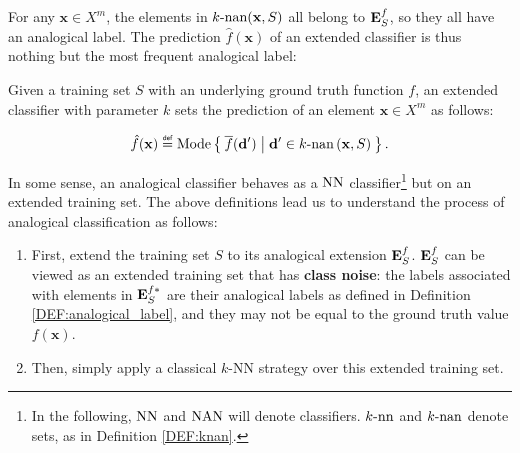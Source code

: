 For any $\mathbf{x} \in X^m$, the elements in $k\text{-nan}(\mathbf{x}, S)$ all belong
to $\mathbf{E}_{S}^{f}$, so they all have an analogical label. The prediction
$\hat{f}(\mathbf{x})$ of an extended classifier is thus nothing but the most
frequent analogical label:

\begin{definition}
  \label{DEF:extended_classifier}
  Given a training set $S$ with an underlying ground truth function $f$,
  an extended classifier with parameter $k$ sets the prediction of an element
  $\mathbf{x} \in X^m$ as follows:

  $$\hat{f}(\mathbf{x}) \eqdef \text{Mode}\Set{\albl{\mathbf{d}'} | \mathbf{d}'
  \in k\text{-nan}\left(\mathbf{x}, S\right)}.
  $$
\end{definition}

In some sense, an analogical classifier behaves as a $\text{NN}$
classifier\footnote{In the following, $\text{NN}$ and $\mbox{NAN}$ will denote classifiers.
$k\text{-nn}$ and $k\text{-nan}$ denote sets, as in Definition \ref{DEF:knan}.} but
on an extended training set. The above definitions lead us to understand the
process of analogical classification as follows:
\begin{enumerate}
  \item First, extend the training set $S$ to its analogical extension
    $\mathbf{E}_{S}^{f}$. $\mathbf{E}_{S}^{f}$ can be viewed as an extended training set that has
    \textbf{class noise}: the labels associated with elements in $\mathbf{E}_{S}^{f*}$ are
    their analogical labels as defined in Definition
    \ref{DEF:analogical_label}, and they may not be equal to the ground truth
    value $f(\mathbf{x})$.
  \item Then, simply apply a classical $k$-NN strategy over this extended
    training set.
\end{enumerate}

